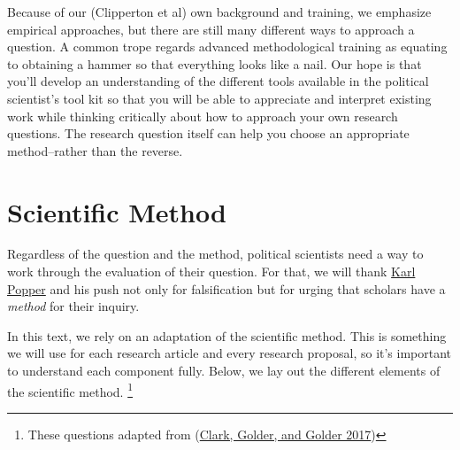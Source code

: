 \documentclass{book}
\begin{document}
Because of our (Clipperton et al) own background and training, we emphasize
empirical approaches, but there are still many different ways to approach a
question. A common trope regards advanced methodological training as equating
to obtaining a hammer so that everything looks like a nail. Our hope is that
you'll develop an understanding of the different tools available in the
political scientist's tool kit so that you will be able to appreciate and
interpret existing work while thinking critically about how to approach your
own research questions. The research question itself can help you choose an
appropriate method--rather than the reverse.

\hypertarget{scientific-method}{%
\section{Scientific Method}\label{scientific-method}}

Regardless of the question and the method, political scientists need a way to
work through the evaluation of their question. For that, we will thank
\href{https://www.iep.utm.edu/pop-sci/}{Karl Popper} and his push not only for
falsification but for urging that scholars have a \emph{method} for their
inquiry.

In this text, we rely on an adaptation of the scientific method. This is
something we will use for each research article and every research proposal,
so it's important to understand each component fully. Below, we lay out the
different elements of the scientific method. \footnote{These questions adapted
  from (\protect\hyperlink{ref-clark2017principles}{Clark, Golder, and Golder
  2017})}
\end{document}
